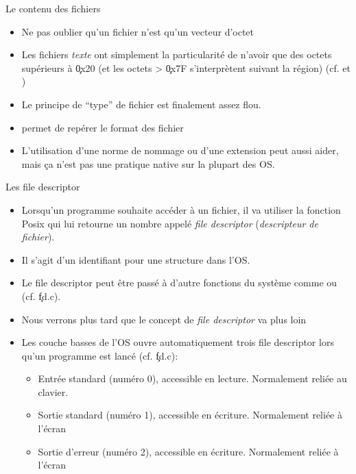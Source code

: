 \begin{frame}[fragile=singleslide]{Le contenu des fichiers}
  \begin{itemize}
    \item Ne pas oublier qu'un fichier n'est qu'un vecteur d'octet
    \item Les fichiers \emph{texte} ont simplement la particularité de
      n'avoir que  des octets supérieurs  à \c{0x20} (et les  octets >
      \c{0x7F} s'interprètent  suivant la région)  (cf. 
      et )
    \item Le principe de ``type'' de fichier est finalement assez flou.
    \item {} permet de repérer le format des fichier
    \item L'utilisation d'une norme de nommage ou d'une extension peut
      aussi  aider, mais  ça  n'est  pas une  pratique  native sur  la
      plupart des OS.
    \end{itemize}
\end{frame}

\begin{frame}[fragile=singleslide]{Les file descriptor}
  \begin{itemize}
  \item  Lorsqu'un programme  souhaite  accéder à  un  fichier, il  va
    utiliser  la  fonction Posix    qui  lui retourne  un
    nombre   appelé  \emph{file  descriptor}   (\emph{descripteur  de
      fichier}).
  \item Il s'agit d'un identifiant pour une structure dans l'OS.
  \item  Le file  descriptor peut  être passé  à d'autre  fonctions du
    système comme  ou  (cf. \c{fd.c}).
  \item  Nous   verrons  plus  tard  que  le   concept  de  \emph{file
      descriptor} va plus loin
  \item  Les couche basses  de l'OS  ouvre automatiquement  trois file
  descriptor lors qu'un programme est lancé (cf. \c{fd.c}):
    \begin{itemize}
    \item    Entrée    standard     (numéro    0),    accessible    en
      lecture. Normalement reliée au clavier.
    \item    Sortie    standard     (numéro    1),    accessible    en
      écriture. Normalement reliée à l'écran
    \item    Sortie    d'erreur     (numéro    2),    accessible    en
      écriture. Normalement reliée à l'écran
    \end{itemize}
  \end{itemize}
\end{frame}

